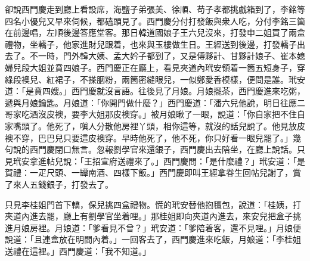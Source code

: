 卻說西門慶走到廳上看設席，海鹽子弟張美、徐順、苟子孝都挑戲箱到了，李銘等四名小優兒又早來伺候，都磕頭見了。西門慶分付打發飯與衆人吃，分付李銘三箇在前邊唱，左順後邊答應堂客。那日韓道國娘子王六兒沒來，打發申二姐買了兩盒禮物，坐轎子，他家進財兒跟着，也來與玉樓做生日。王經送到後邊，打發轎子出去了。不一時，門外韓大姨、孟大妗子都到了，又是傅夥計、甘夥計娘子、崔本媳婦兒段大姐並賁四娘子。西門慶正在廳上，看見夾道內玳安領着一箇五短身子，穿綠段襖兒、紅裙子，不搽胭粉，兩箇密縫眼兒，一似鄭愛香模樣，便問是誰。玳安道：「是賁四嫂。」西門慶就沒言語。{}往後見了月娘。月娘擺茶，西門慶進來吃粥，遞與月娘鑰匙。月娘道：「你開門做什麼？」西門慶道：「潘六兒他說，明日往應二哥家吃酒沒皮襖，要李大姐那皮襖穿。」被月娘瞅了一眼，說道：「你自家把不住自家嘴頭了。他死了，嗔人分散他房裡丫頭，相你這等，就沒的話兒說了。他見放皮襖不穿，巴巴兒只要這皮襖穿。早時他死了，他不死，你只好看一眼兒罷了。」{}幾句說的西門慶閉口無言。忽報劉學官來還銀子，西門慶出去陪坐，在廳上說話。只見玳安拿進帖兒說：「王招宣府送禮來了。」西門慶問：「是什麼禮？」玳安道：「是賀禮：一疋尺頭、一罈南酒、四樣下飯。」西門慶即叫王經拿眷生回帖兒謝了，賞了來人五錢銀子，打發去了。

只見李桂姐門首下轎，保兒挑四盒禮物。慌的玳安替他抱氊包，說道：「桂姨，打夾道內進去罷，廳上有劉學官坐着哩。」那桂姐即向夾道內進去，來安兒把盒子挑進月娘房裡。月娘道：「爹看見不曾？」{}玳安道：「爹陪着客，還不見哩。」月娘便說道：「且連盒放在明間內着。」一回客去了，西門慶進來吃飯，月娘道：「李桂姐送禮在這裡。」西門慶道：「我不知道。」

